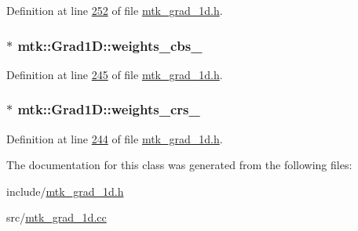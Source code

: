 Definition at line \hyperlink{mtk__grad__1d_8h_source_l00252}{252} of file \hyperlink{mtk__grad__1d_8h_source}{mtk\+\_\+grad\+\_\+1d.\+h}.

\hypertarget{classmtk_1_1Grad1D_ae6b0a908748923b2acd97e5bf7acc000}{
\subsubsection[{weights\+\_\+cbs\+\_\+}]{$\ast$ mtk\+::\+Grad1\+D\+::weights\+\_\+cbs\+\_\+\hspace{0.3cm}{\ttfamily [private]}}}\label{classmtk_1_1Grad1D_ae6b0a908748923b2acd97e5bf7acc000}


Definition at line \hyperlink{mtk__grad__1d_8h_source_l00245}{245} of file \hyperlink{mtk__grad__1d_8h_source}{mtk\+\_\+grad\+\_\+1d.\+h}.

\hypertarget{classmtk_1_1Grad1D_a96914abea78528b32499963ce9bbe4a6}{
\subsubsection[{weights\+\_\+crs\+\_\+}]{$\ast$ mtk\+::\+Grad1\+D\+::weights\+\_\+crs\+\_\+\hspace{0.3cm}{\ttfamily [private]}}}\label{classmtk_1_1Grad1D_a96914abea78528b32499963ce9bbe4a6}


Definition at line \hyperlink{mtk__grad__1d_8h_source_l00244}{244} of file \hyperlink{mtk__grad__1d_8h_source}{mtk\+\_\+grad\+\_\+1d.\+h}.



The documentation for this class was generated from the following files\+:\begin{DoxyCompactItemize}
\item 
include/\hyperlink{mtk__grad__1d_8h}{mtk\+\_\+grad\+\_\+1d.\+h}\item 
src/\hyperlink{mtk__grad__1d_8cc}{mtk\+\_\+grad\+\_\+1d.\+cc}\end{DoxyCompactItemize}
